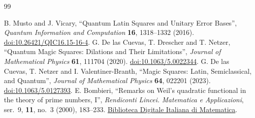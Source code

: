\begin{thebibliography}{99}
 B. Musto and J. Vicary, ``Quantum Latin Squares and Unitary Error Bases'', \emph{Quantum Information and Computation} \textbf{16}, 1318--1332 (2016). \href{https://doi.org/10.26421/QIC16.15-16-4}{doi:10.26421/QIC16.15-16-4}.
 G. De las Cuevas, T. Drescher and T. Netzer, ``Quantum Magic Squares: Dilations and Their Limitations'', \emph{Journal of Mathematical Physics} \textbf{61}, 111704 (2020). \href{https://doi.org/10.1063/5.0022344}{doi:10.1063/5.0022344}.
 G. De las Cuevas, T. Netzer and I. Valentiner-Branth, ``Magic Squares: Latin, Semiclassical, and Quantum'', \emph{Journal of Mathematical Physics} \textbf{64}, 022201 (2023). \href{https://doi.org/10.1063/5.0127393}{doi:10.1063/5.0127393}.
 E. Bombieri,
``Remarks on Weil's quadratic functional in the theory of prime numbers, I'',
\emph{Rendiconti Lincei. Matematica e Applicazioni},
ser.~9, \textbf{11}, no.~3 (2000), 183--233.
\href{https://www.bdim.eu/item?id=RLIN_2000_9_11_3_183_0}{Biblioteca Digitale Italiana di Matematica}.
\end{thebibliography}

